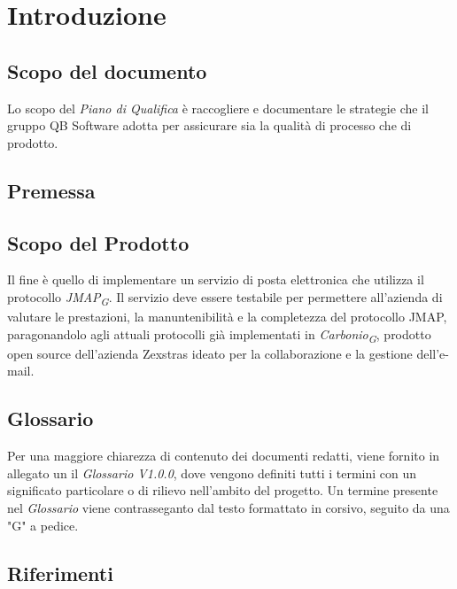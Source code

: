 \section{Introduzione}

\subsection{Scopo del documento}
Lo scopo del \textit{Piano di Qualifica} è raccogliere e documentare le strategie che il gruppo QB Software
adotta per assicurare sia la qualità di processo che di prodotto.

\subsection{Premessa}


\subsection{Scopo del Prodotto}
Il fine è quello di implementare un servizio di posta elettronica che utilizza il protocollo \textit{JMAP\textsubscript{G}}.
Il servizio deve essere testabile per permettere all'azienda di valutare le prestazioni, la manuntenibilità e 
la completezza del protocollo JMAP, paragonandolo agli attuali protocolli già implementati in 
\textit{Carbonio\textsubscript{G}}, prodotto open source dell'azienda Zexstras ideato per la collaborazione 
e la gestione dell'e-mail.


\subsection{Glossario}
Per una maggiore chiarezza di contenuto dei documenti redatti, viene fornito in allegato un il \textit{Glossario V1.0.0}, 
dove vengono definiti tutti i termini con un significato particolare o di rilievo nell'ambito del progetto. 
Un termine presente nel \textit{Glossario} viene contrasseganto dal testo formattato in corsivo, seguito da una "G"
a pedice.


\subsection{Riferimenti}
